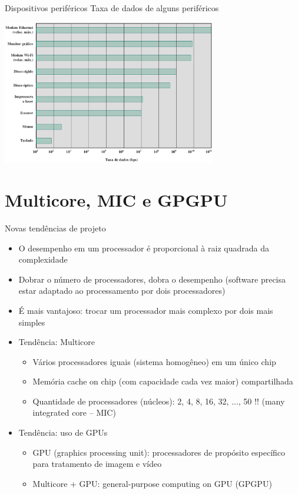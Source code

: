 \begin{slide}[toc=]{Dispositivos periféricos}
	Taxa de dados de alguns periféricos
	\begin{center}
		\includegraphics[width=0.7\textwidth]{figs/taxa-dados}
	\end{center}
\end{slide}

\section[slide=true]{Multicore, MIC e GPGPU}
\begin{slide}[toc=]{Novas tendências de projeto}
	\begin{itemize}
		\item O desempenho em um processador é proporcional à raiz quadrada da complexidade\pause
		\item Dobrar o número de processadores, dobra o desempenho (software precisa estar adaptado ao processamento por dois processadores)\pause
		\item É mais vantajoso: trocar um processador mais complexo por dois mais simples\pause
		\item Tendência: Multicore 
			\begin{itemize}
				\item Vários processadores iguais (sistema homogêneo) em um único chip\pause
				\item Memória cache on chip (com capacidade cada vez maior) compartilhada\pause
				\item Quantidade de processadores (núcleos): 2, 4, 8, 16, 32, ..., 50 !! (many integrated core -- MIC)\pause
			\end{itemize}
		\item Tendência: uso de GPUs
			\begin{itemize}
				\item GPU (graphics processing unit): processadores de propósito específico para tratamento de imagem e vídeo\pause
				\item Multicore + GPU: general-purpose computing on GPU (GPGPU)
			\end{itemize}
	\end{itemize}
\end{slide}

